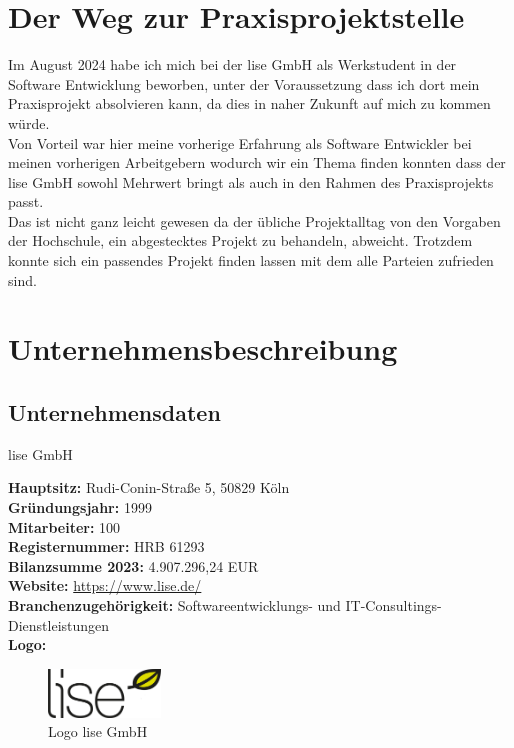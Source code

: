 \chapter{Der Weg zur Praxisprojektstelle}\label{ch:weg_zur_pp}
Im August 2024 habe ich mich bei der lise GmbH als Werkstudent in der Software Entwicklung beworben, unter der Voraussetzung dass ich dort
mein Praxisprojekt absolvieren kann, da dies in naher Zukunft auf mich zu kommen würde.\\
Von Vorteil war hier meine vorherige Erfahrung als Software Entwickler bei meinen vorherigen Arbeitgebern wodurch wir ein
Thema finden konnten dass der lise GmbH sowohl Mehrwert bringt als auch in den Rahmen des Praxisprojekts passt.\\
Das ist nicht ganz leicht gewesen da der übliche Projektalltag von den Vorgaben der Hochschule, ein abgestecktes Projekt zu behandeln, abweicht.
Trotzdem konnte sich ein passendes Projekt finden lassen mit dem alle Parteien zufrieden sind.

\chapter{Unternehmensbeschreibung}\label{ch:unternehmen}
\section{Unternehmensdaten}\label{sec:nternehmensdaten}
lise GmbH

\textbf{Hauptsitz:} Rudi-Conin-Straße 5, 50829 Köln\\
\textbf{Gründungsjahr:} 1999\\
\textbf{Mitarbeiter: } 100\\
\textbf{Registernummer: } HRB 61293\\
\textbf{Bilanzsumme 2023: } 4.907.296,24 EUR \autocite{unternehmensregister2024}\\
\textbf{Website:} \url{https://www.lise.de/}\\
\textbf{Branchenzugehörigkeit:} Softwareentwicklungs- und IT-Consultings-Dienstleistungen\\
\textbf{Logo:}
\begin{figure}[H]
    \begin{center}
        \includegraphics[width=3cm]{bilder/lise_logo_web.png}
        \caption{Logo lise GmbH}\label{fig:lise}
    \end{center}
\end{figure}

